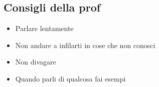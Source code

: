 \documentclass{article}
\begin{document}
\begin{enumerate}
\end{enumerate}

\subsection{Consigli della prof}
\begin{itemize}
    \item Parlare lentamente
    \item Non andare a infilarti in cose che non conosci
    \item Non divagare
    \item Quando parli di qualcosa fai esempi
\end{itemize}
\end{document}

